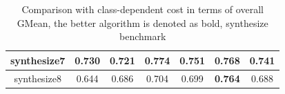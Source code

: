 \documentclass{article}
\begin{document}
\begin{table}[!ht]
\begin{tabular}{|c||c|ccccc|}
		synthesize7               & 0.730                                 & \multicolumn{1}{c|}{0.721}          & \multicolumn{1}{c|}{\textbf{0.774}} & \multicolumn{1}{c|}{0.751}          & \multicolumn{1}{c|}{0.768}          & 0.741          \\ \hline
		synthesize8               & 0.644                                 & \multicolumn{1}{c|}{0.686}          & \multicolumn{1}{c|}{0.704}          & \multicolumn{1}{c|}{0.699}          & \multicolumn{1}{c|}{\textbf{0.764}}          & 0.688          \\ \hline
	\end{tabular}
	\label{tab01:overall}
	\caption{Comparison with class-dependent cost in terms of overall GMean, the better algorithm is denoted as bold, synthesize benchmark}
\end{table}
\end{document}
